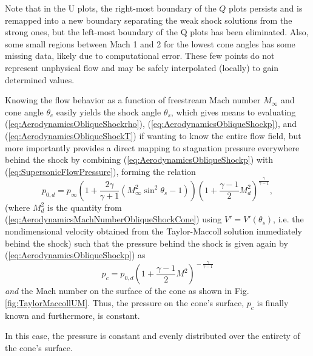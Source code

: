 \documentclass[11pt,dvipsnames]{thesis}
\begin{document}
Note that in the U plots, the right-most boundary of the $Q$ plots persists and is remapped into a new boundary separating the weak shock solutions from the strong ones, but the left-most boundary of the Q plots has been eliminated. Also, some small regions between Mach 1 and 2 for the lowest cone angles has some missing data, likely due to computational error. These few points do not represent unphysical flow and may be safely interpolated (locally) to gain determined values.

Knowing the flow behavior as a function of freestream Mach number $M_\infty$ and cone angle $\theta_c$ easily yields the shock angle $\theta_s$, which gives means to evaluating (\ref{eq:AerodynamicsObliqueShockrho}), (\ref{eq:AerodynamicsObliqueShockp}), and (\ref{eq:AerodynamicsObliqueShockT}) if wanting to know the entire flow field, but more importantly provides a direct mapping to stagnation pressure everywhere behind the shock by combining (\ref{eq:AerodynamicsObliqueShockp}) with (\ref{eq:SupersonicFlowPressure}), forming the relation
\begin{equation}
p_{0,d} = p_\infty\left(1 + \frac{2\gamma}{\gamma + 1}(M_\infty^2 \sin^2\theta_s - 1)\right)\left(1 + \frac{\gamma - 1}{2} M_d^2\right)^{\!\frac{\gamma}{\gamma - 1}},
\end{equation}
(where $M_d^2$ is the quantity from (\ref{eq:AerodynamicsMachNumberObliqueShockCone}) using $V' = V'(\theta_s)$, i.e. the nondimensional velocity obtained from the Taylor-Maccoll solution immediately behind the shock) such that the pressure behind the shock is given again by (\ref{eq:AerodynamicsObliqueShockp}) as
\begin{equation}
p_c = p_{0,d}\left(1 + \frac{\gamma - 1}{2} M^2\right)^{\!-\frac{\gamma}{\gamma - 1}}
\end{equation}
\textit{and} the Mach number on the surface of the cone as shown in Fig. \ref{fig:TaylorMaccollUM}. Thus, the pressure on the cone's surface, $p_c$ is finally known and furthermore, is constant.

In this case, the pressure is constant and evenly distributed over the entirety of the cone's surface.
\end{document}
